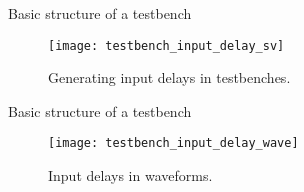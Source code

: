 %
\begin{frame}{Basic structure of a testbench}{}
  \begin{figure}
    \centering
    \texttt{[image: testbench\_input\_delay\_sv]}
    \vspace{-6pt}
    \caption{Generating input delays in testbenches.}
    \label{Figure:testbench_input_delay_sv}
  \end{figure}
\end{frame}


%
\begin{frame}{Basic structure of a testbench}{}
  \begin{figure}
    \centering
    \texttt{[image: testbench\_input\_delay\_wave]}
    \vspace{-8pt}
    \caption{Input delays in waveforms.}
    \label{Figure:testbench_input_delay_wave}
  \end{figure}
\end{frame}

